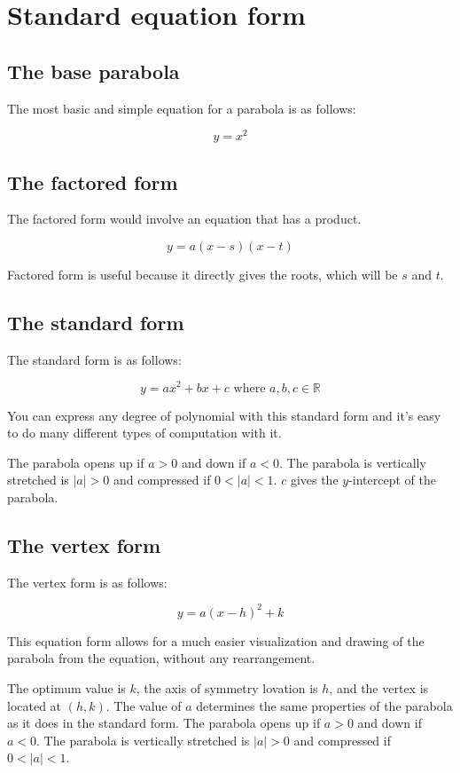 \documentclass[12pt]{article}
\begin{document}
\newpage

\section{Standard equation form}

\subsection{The base parabola}

The most basic and simple equation for a parabola is as follows:

\[
\boxed{
y = x^2
}
\]

\subsection{The factored form}

The factored form would involve an equation that has a product.

\[
\boxed{
y = a(x - s)(x - t)
}
\]

Factored form is useful because it directly gives the roots, which will be $s$ and $t$.

\subsection{The standard form}

The standard form is as follows:

\[
\boxed{
y = ax^2 + bx + c
}
\text{ where } a,b,c \in \mathbb{R}
\]

You can express any degree of polynomial with this standard form and it's easy to do many different types of computation with it.

The parabola opens up if $a>0$ and down if $a<0$.
The parabola is vertically stretched is $|a| > 0$ and compressed if $0 < |a| < 1$.
$c$ gives the $y$-intercept of the parabola.

\subsection{The vertex form}

The vertex form is as follows:

\[
\boxed{
y = a(x - h)^2 + k
}
\]

This equation form allows for a much easier visualization and drawing of the parabola from the equation, without any rearrangement.

The optimum value is $k$, the axis of symmetry lovation is $h$, and the vertex is located at $(h, k)$.
The value of $a$ determines the same properties of the parabola as it does in the standard form.
The parabola opens up if $a>0$ and down if $a<0$.
The parabola is vertically stretched is $|a| > 0$ and compressed if $0 < |a| < 1$.
\end{document}

